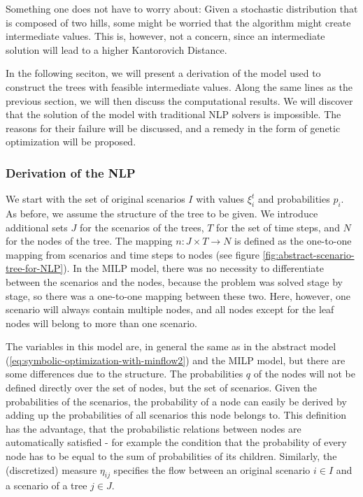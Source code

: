 \documentclass[a4paper, 12pt] {article}
\begin{document}
Something one does not have to worry about: Given a stochastic distribution that is composed of two hills, some might be worried that the algorithm might create intermediate values. This is, however, not a concern, since an intermediate solution will lead to a higher Kantorovich Distance.

In the following seciton, we will present a derivation of the model used to construct the trees with feasible intermediate values. Along the same lines as the previous section, we will then discuss the computational results. We will discover that the solution of the model with traditional NLP solvers is impossible. The reasons for their failure will be discussed, and a remedy in the form of genetic optimization will be proposed.
\subsubsection{Derivation of the NLP}
We start with the set of original scenarios $I$ with values $\xi_i^t$ and probabilities $p_i$. As before, we assume the structure of the tree to be given. We introduce additional sets $J$ for the scenarios of the trees, $T$ for the set of time steps, and $N$ for the nodes of the tree. The mapping $n:J\times T\rightarrow N$ is defined as the one-to-one mapping from scenarios and time steps to nodes (see figure \ref{fig:abstract-scenario-tree-for-NLP}). In the MILP model, there was no necessity to differentiate between the scenarios and the nodes, because the problem was solved stage by stage, so there was a one-to-one mapping between these two. Here, however, one scenario will always contain multiple nodes, and all nodes except for the leaf nodes will belong to more than one scenario.

The variables in this model are, in general the same as in the abstract model (\ref{eq:symbolic-optimization-with-minflow2}) and the MILP model, but there are some differences due to the structure. The probabilities $q$ of the nodes will not be defined directly over the set of nodes, but the set of scenarios. Given the probabilities of the scenarios, the probability of a node can easily be derived by adding up the probabilities of all scenarios this node belongs to. This definition has the advantage, that the probabilistic relations between nodes are automatically satisfied - for example the condition that the probability of every node has to be equal to the sum of probabilities of its children.  Similarly, the (discretized) measure $\eta_{ij}$ specifies the flow between an original scenario $i \in I$ and a scenario of a tree $j \in J$.
\end{document}
